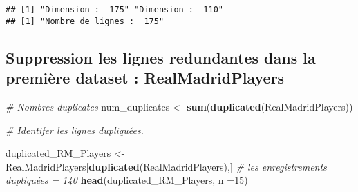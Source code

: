 \documentclass[
  6pt,
]{article}
\newenvironment{Shaded}{\begin{snugshade}}{\end{snugshade}}
\newcommand{\AttributeTok}[1]{\textcolor[rgb]{0.13,0.29,0.53}{#1}}
\newcommand{\CommentTok}[1]{\textcolor[rgb]{0.56,0.35,0.01}{\textit{#1}}}
\newcommand{\DecValTok}[1]{\textcolor[rgb]{0.00,0.00,0.81}{#1}}
\newcommand{\FunctionTok}[1]{\textcolor[rgb]{0.13,0.29,0.53}{\textbf{#1}}}
\newcommand{\NormalTok}[1]{#1}
\newcommand{\OtherTok}[1]{\textcolor[rgb]{0.56,0.35,0.01}{#1}}
\begin{document}
\begin{verbatim}
## [1] "Dimension :  175" "Dimension :  110"
## [1] "Nombre de lignes :  175"
\end{verbatim}

\subsection{Suppression les lignes redundantes dans la première dataset
:
RealMadridPlayers}\label{suppression-les-lignes-redundantes-dans-la-premiuxe8re-dataset-realmadridplayers}

\begin{Shaded}
\begin{Highlighting}[]
\CommentTok{\# Nombres duplicates}
\NormalTok{num\_duplicates }\OtherTok{\textless{}{-}} \FunctionTok{sum}\NormalTok{(}\FunctionTok{duplicated}\NormalTok{(RealMadridPlayers))}

\CommentTok{\# Identifer les lignes dupliquées. }

\NormalTok{duplicated\_RM\_Players }\OtherTok{\textless{}{-}}\NormalTok{ RealMadridPlayers[}\FunctionTok{duplicated}\NormalTok{(RealMadridPlayers),]}
\CommentTok{\# les enregistrements dupliquées = 140}
\FunctionTok{head}\NormalTok{(duplicated\_RM\_Players, }\AttributeTok{n =}\DecValTok{15}\NormalTok{)}
\end{Highlighting}
\end{Shaded}
\end{document}
